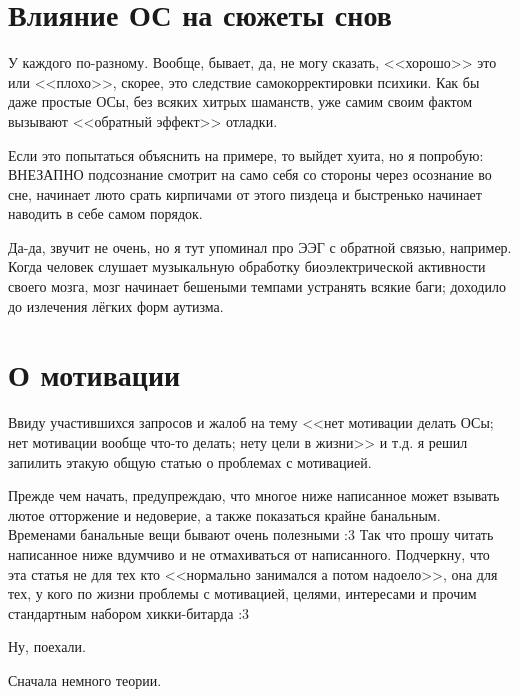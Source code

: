 \documentclass[a5paper,12pt,twoside]{memoir}
\begin{document}
\section{Влияние ОС на сюжеты снов}

\medskip
У каждого по-разному. Вообще, бывает, да, не могу сказать, <<хорошо>> это или <<плохо>>, скорее, это следствие самокорректировки психики. Как бы даже простые ОСы, без всяких хитрых шаманств, уже самим своим фактом вызывают <<обратный эффект>> отладки. 

Если это попытаться объяснить на примере, то выйдет хуита, но я попробую: ВНЕЗАПНО подсознание смотрит на само себя со стороны через осознание во сне, начинает люто срать кирпичами от этого пиздеца и быстренько начинает наводить в себе самом порядок. 

Да-да, звучит не очень, но я тут упоминал про ЭЭГ с обратной связью, например. Когда человек слушает музыкальную обработку биоэлектрической активности своего мозга, мозг начинает бешеными темпами устранять всякие баги; доходило до излечения лёгких форм аутизма.




\section{О мотивации}

Ввиду участившихся запросов и жалоб на тему <<нет мотивации делать ОСы; нет мотивации вообще что-то делать; нету цели в жизни>> и т.д. я решил запилить этакую общую статью о проблемах с мотивацией.

Прежде чем начать, предупреждаю, что многое ниже написанное может взывать лютое отторжение и недоверие, а также показаться крайне банальным. Временами банальные вещи бывают очень полезными :3 Так что прошу читать написанное ниже вдумчиво и не отмахиваться от написанного. Подчеркну, что эта статья не для тех кто <<нормально занимался а потом надоело>>, она для тех, у кого по жизни проблемы с мотивацией, целями, интересами и прочим стандартным набором хикки-битарда :3

Ну, поехали.

Сначала немного теории.
\end{document}
